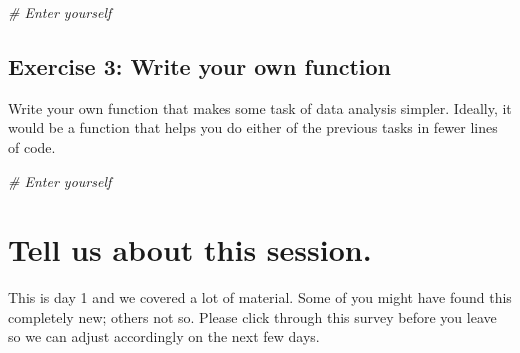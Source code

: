 \documentclass[]{book}
\newenvironment{Shaded}{\begin{snugshade}}{\end{snugshade}}
\newcommand{\CommentTok}[1]{\textcolor[rgb]{0.56,0.35,0.01}{\textit{#1}}}
\theoremstyle{definition}
\theoremstyle{definition}
\theoremstyle{definition}
\theoremstyle{remark}
\begin{document}
\begin{Shaded}
\begin{Highlighting}[]
\CommentTok{# Enter yourself}
\end{Highlighting}
\end{Shaded}

\subsection{Exercise 3: Write your own
function}\label{exercise-3-write-your-own-function}

Write your own function that makes some task of data analysis simpler.
Ideally, it would be a function that helps you do either of the previous
tasks in fewer lines of code.

\begin{Shaded}
\begin{Highlighting}[]
\CommentTok{# Enter yourself}
\end{Highlighting}
\end{Shaded}

\section{Tell us about this session.}\label{tell-us-about-this-session.}

This is day 1 and we covered a lot of material. Some of you might have
found this completely new; others not so. Please click through this
survey before you leave so we can adjust accordingly on the next few
days.


\end{document}
